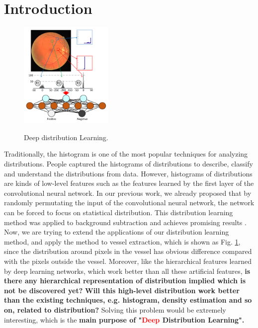 \documentclass[UTF8]{article}
\newcommand{\reffig}[1]{Fig. \ref{#1}}
\begin{document}
\section*{Introduction}
\begin{figure}
  \includegraphics[width=0.4\textwidth]{figure/fig1.pdf}\\
    \label{fig1}
  \caption{Deep distribution Learning.}
    \label{fig1}
\end{figure}



Traditionally,
the histogram is one of the most popular techniques for analyzing distributions.
%
People captured the histograms of distributions to describe, classify and understand the distributions from data.
%
However,
histograms of distributions are kinds of low-level features such as the features learned by the first layer of the convolutional neural network.
%
In our previous work,
we already proposed that by randomly permutating the input of the convolutional neural network,
the network can be forced to focus on statistical distribution.
%
This distribution learning method was applied to background subtraction and achieves promising results \cite{2018_ICME_8486510}.
%
Now, we are trying to extend the applications of our distribution learning method,
and apply the method to vessel extraction,
which is shown as \reffig{fig1},
since the distribution around pixels in the vessel has obvious difference compared with the pixels outside the vessel.
%
Moreover,
like the hierarchical features learned by deep learning networks,
which work better than all these artificial features,
\textbf{is there any hierarchical representation of distribution implied which is not be discovered yet?}
%
\textbf{Will this high-level distribution work better than the existing techniques, e.g. histogram, density estimation and so on, related to distribution?}
%
Solving this problem would be extremely interesting, which is the \textbf{main purpose of "\textcolor{red}{Deep} Distribution Learning".}



\small

% 
  
\end{document}
